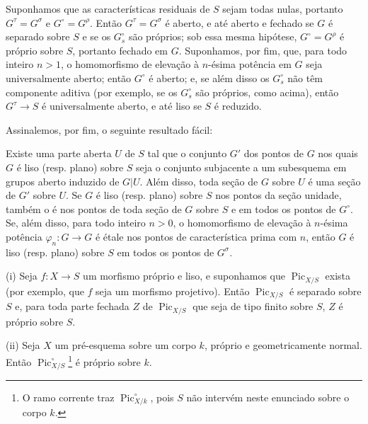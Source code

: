  Suponhamos que as características residuais de $S$
sejam todas nulas, portanto $G^\tau=G^\sigma$ e $G^\circ=G^\rho$. Então
$G^\tau=G^\sigma$ é aberto, e até aberto e fechado se $G$ é separado sobre $S$
e se os $G_s^\circ$ são próprios; sob essa mesma hipótese, $G^\circ=G^\rho$ é
próprio sobre $S$, portanto fechado em $G$. Suponhamos, por fim, que, para todo
inteiro $n>1$, o homomorfismo de elevação à $n$-ésima potência em $G$ seja
universalmente aberto; então $G^\circ$ é aberto; e, se além disso os
$G_s^\circ$ não têm componente aditiva (por exemplo, se os $G_s^\circ$ são
próprios, como acima), então $G^\tau\longrightarrow S$ é universalmente aberto,
e até liso se $S$ é reduzido.

Assinalemos, por fim, o seguinte resultado fácil:

 Existe uma parte aberta $U$ de $S$ tal que o conjunto
$G'$ dos pontos de $G$ nos quais $G$ é liso (resp. plano) sobre $S$ seja o
conjunto subjacente a um subesquema em grupos aberto induzido de $G|U$. Além
disso, toda seção de $G$ sobre $U$ é uma seção de $G'$ sobre $U$.
 Se $G$ é liso (resp. plano) sobre $S$ nos pontos da
seção unidade, também o é nos pontos de toda seção de $G$
sobre $S$ e em todos os pontos de $G^\circ$. Se, além disso, para todo inteiro
$n>0$, o homomorfismo de elevação à $n$-ésima potência
$\varphi_n:G\longrightarrow G$ é étale nos pontos de característica prima com
$n$, então $G$ é liso (resp. plano) sobre $S$ em todos os pontos de $G^\sigma$.



\noindent(i) Seja $f:X\longrightarrow S$ um morfismo próprio e liso, e
suponhamos que $\operatorname{Pic}_{X/S}$ exista (por exemplo, que $f$ seja um
morfismo projetivo). Então $\operatorname{Pic}_{X/S}$ é separado sobre $S$ e,
para toda parte fechada $Z$ de $\operatorname{Pic}_{X/S}$ que seja de tipo
finito sobre $S$, $Z$ é próprio sobre $S$.

\noindent(ii) Seja $X$ um pré-esquema sobre um corpo $k$, próprio e
geometricamente normal. Então $\operatorname{Pic}_{X/S}^\circ$\footnote{O ramo
corrente traz $\operatorname{Pic}_{X/k}^\circ$, pois $S$ não intervém neste
enunciado sobre o corpo $k$.} é próprio sobre $k$.

